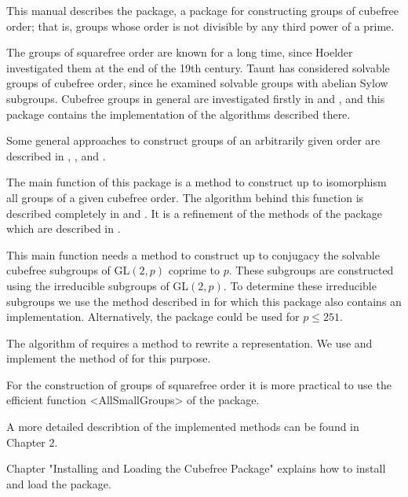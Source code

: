 



This manual describes the {\Cubefree}  package,
a {\GAP} package for constructing groups of cubefree order; that is, groups
whose order is not divisible by any third power of a prime.

The groups of squarefree order are known for a long time, since Hoelder
\cite{Hol93} investigated them at the end of the 19th century. Taunt
\cite{Tau55} has considered solvable groups of cubefree order, since he
examined solvable groups with abelian Sylow subgroups. Cubefree groups in
general are investigated firstly in \cite{Di05} and \cite{DiEi05}, and this
package contains the implementation of the algorithms described
there.

Some general approaches to construct groups of an arbitrarily given order are
described in \cite{BeEia}, \cite{BeEib}, and \cite{BeEiO}.

The main function of this package is a method to construct up to isomorphism
all groups of a given cubefree order. The algorithm behind this function is
described completely in \cite{Di05} and \cite{DiEi05}. It is a refinement of
the methods of the {\GrpConst} package which are described in \cite{GrpConst}.

This main function needs a method to construct up to conjugacy the solvable
cubefree subgroups of GL$(2,p)$ coprime to $p$. These subgroups are
constructed using the irreducible subgroups of GL$(2,p)$. To determine these
irreducible subgroups we use the method described in \cite{FlOB05} for which this package
also contains an implementation. Alternatively, the {\Irredsol} package
\cite{Irredsol} could be used for $p\le 251$.

The algorithm of \cite{FlOB05} requires a method to rewrite a
representation. We use and implement the method of \cite{GlHo97} for this purpose.

For the construction of groups of squarefree order it is more practical to
use the efficient function <AllSmallGroups> of the {\GrpConst} package.

A more detailed describtion of the implemented methods can be found in Chapter 2.

Chapter "Installing and Loading the Cubefree Package" explains
how to install and load the {\Cubefree} package.
